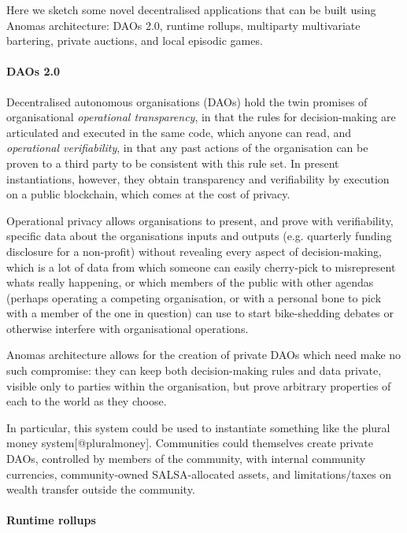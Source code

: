 Here we sketch some novel decentralised applications that can be built
using Anoma\textquotesingle s architecture: DAOs 2.0, runtime rollups,
multiparty multivariate bartering, private auctions, and local episodic
games.

\paragraph{DAOs 2.0}\label{daos-20}

Decentralised autonomous organisations (DAOs) hold the twin promises of
organisational \emph{operational transparency}, in that the rules for
decision-making are articulated and executed in the same code, which
anyone can read, and \emph{operational verifiability}, in that any past
actions of the organisation can be proven to a third party to be
consistent with this rule set. In present instantiations, however, they
obtain transparency and verifiability by execution on a public
blockchain, which comes at the cost of privacy.

Operational privacy allows organisations to present, and prove with
verifiability, specific data about the organisations inputs and outputs
(e.g. quarterly funding disclosure for a non-profit) without revealing
every aspect of decision-making, which is a lot of data from which
someone can easily cherry-pick to misrepresent what\textquotesingle s
really happening, or which members of the public with other agendas
(perhaps operating a competing organisation, or with a personal bone to
pick with a member of the one in question) can use to start
bike-shedding debates or otherwise interfere with organisational
operations.

Anoma\textquotesingle s architecture allows for the creation of private
DAOs which need make no such compromise: they can keep both
decision-making rules and data private, visible only to parties within
the organisation, but prove arbitrary properties of each to the world as
they choose.

In particular, this system could be used to instantiate something like
the plural money system{[}@pluralmoney{]}. Communities could themselves
create private DAOs, controlled by members of the community, with
internal community currencies, community-owned SALSA-allocated assets,
and limitations/taxes on wealth transfer outside the community.

\paragraph{Runtime rollups}\label{runtime-rollups}

